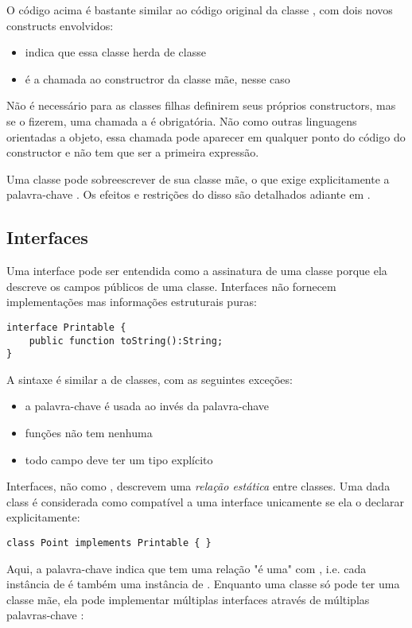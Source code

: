 O código acima é bastante similar ao código original da classe , com dois novos constructs envolvidos:
\begin{itemize}
 \item {} indica que essa classe herda de classe 
 \item {} é a chamada ao constructror da classe mãe, nesse caso 
\end{itemize}
Não é necessário para as classes filhas definirem seus próprios constructors, mas se o fizerem, uma chamada a  é obrigatória. Não como outras linguagens orientadas a objeto, essa chamada pode aparecer em qualquer ponto do código do constructor e não tem que ser a primeira expressão.

Uma classe pode sobreescrever  de sua classe mãe, o que exige explicitamente a palavra-chave . Os efeitos e restrições do disso são detalhados adiante em  .

\subsection{Interfaces}
\label{types-interfaces}

Uma interface pode ser entendida como a assinatura de uma classe porque ela descreve os campos públicos de uma classe. Interfaces não fornecem implementações mas informações estruturais puras:

\begin{lstlisting}
interface Printable {
	public function toString():String;
}
\end{lstlisting}
A sintaxe é similar a de classes, com as seguintes exceções:

\begin{itemize}
	\item a palavra-chave  é usada ao invés da palavra-chave  
	\item funções não tem nenhuma 
	\item todo campo deve ter um tipo explícito 
\end{itemize}
Interfaces, não como , descrevem uma \emph{relação estática} entre classes. Uma dada class é considerada como compatível a uma interface unicamente se ela o declarar explicitamente:

\begin{lstlisting}
class Point implements Printable { }
\end{lstlisting}
Aqui, a palavra-chave  indica que  tem uma relação "é uma" com , i.e. cada instância de  é também uma instância de . Enquanto uma classe só pode ter uma classe mãe, ela pode implementar múltiplas interfaces através de múltiplas palavras-chave :

